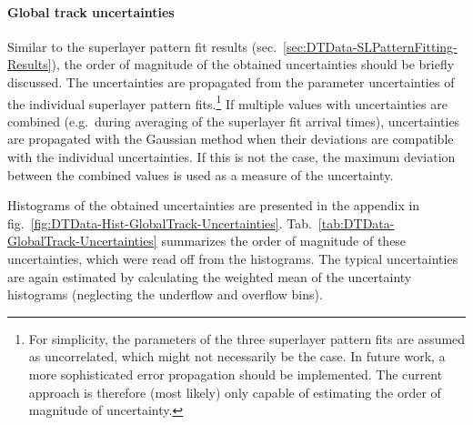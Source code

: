 \paragraph{Global track uncertainties}
Similar to the superlayer pattern fit results (sec.\ \ref{sec:DTData-SLPatternFitting-Results}), the order of magnitude of the obtained uncertainties should be briefly discussed. The uncertainties are propagated from the parameter uncertainties of the individual superlayer pattern fits.\footnote{For simplicity, the parameters of the three superlayer pattern fits are assumed as uncorrelated, which might not necessarily be the case. In future work, a more sophisticated error propagation should be implemented. The current approach is therefore (most likely) only capable of estimating the order of magnitude of uncertainty.} If multiple values with uncertainties are combined (e.g.\ during averaging of the superlayer fit arrival times), uncertainties are propagated with the Gaussian method when their deviations are compatible with the individual uncertainties. If this is not the case, the maximum deviation between the combined values is used as a measure of the uncertainty.
\par Histograms of the obtained uncertainties are presented in the appendix in fig.\ \ref{fig:DTData-Hist-GlobalTrack-Uncertainties}. Tab.\ \ref{tab:DTData-GlobalTrack-Uncertainties} summarizes the order of magnitude of these uncertainties, which were read off from the histograms. The typical uncertainties are again estimated by calculating the weighted mean of the uncertainty histograms (neglecting the underflow and overflow bins).
